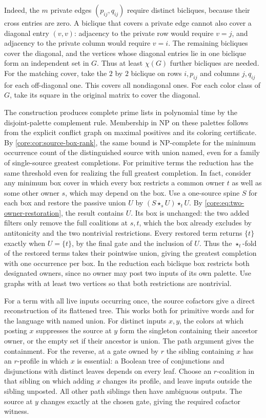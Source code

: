 Indeed, the $m$ private edges $(p_{ij},q_{ij})$
require distinct bicliques, because their cross
entries are zero. A biclique that covers a private
edge cannot also cover a diagonal entry $(v,v)$:
adjacency to the private row would require $v=j$,
and adjacency to the private column would require
$v=i$. The remaining bicliques cover the diagonal,
and the vertices whose diagonal entries lie in one
biclique form an independent set in $G$. Thus at
least $\chi(G)$ further bicliques are needed. For
the matching cover, take the $2$ by $2$ biclique on
rows $i,p_{ij}$ and columns $j,q_{ij}$ for each
off-diagonal one. This covers all nondiagonal ones.
For each color class of $G$, take its square in the
original matrix to cover the diagonal.

The construction produces complete prime lists in
polynomial time by the disjoint-palette complement
rule. Membership in NP on these palettes follows
from the explicit conflict graph on maximal positives
and its coloring certificate. By
\cref{core:cor:source-box-rank}, the same bound is
NP-complete for the minimum occurrence count of the
distinguished source with union named, even for a
family of single-source greatest completions. For
primitive terms the reduction has the same threshold
even for realizing the full greatest completion.
In fact, consider any minimum box cover in which
every box restricts a common owner $t$ as well as
some other owner $s$, which may depend on the box.
Use a one-source spine $S$ for each box and restore
the passive union $U$ by $(S\star_s U)\star_t U$.
By \eqref{core:eq:two-owner-restoration}, the result
contains $U$. Its box is unchanged: the two added
filters only remove the full coalitions at $s,t$,
which the box already excludes by antitonicity and
the two nontrivial restrictions. Every restored
term returns $\{t\}$ exactly when $U=\{t\}$, by
the final gate and the inclusion of $U$. Thus the
$\star_t$-fold of the restored terms takes their
pointwise union, giving the greatest completion
with one occurrence per box. In the reduction each
biclique box restricts both designated owners,
since no owner may post two inputs of its own
palette. Use graphs with at least two vertices so
that both restrictions are nontrivial.

For a term with all live inputs occurring once, the source
cofactors give a direct reconstruction of its flattened tree.
This works both for primitive words and for the language with
named union. For distinct inputs $x,y$, the colors at which
posting $x$ suppresses the source at $y$ form the singleton
containing their ancestor owner, or the empty set if their
ancestor is union. The path argument gives the containment.
For the reverse, at a gate owned by $r$ the sibling containing
$x$ has an $r$-profile in which $x$ is essential: a Boolean
tree of conjunctions and disjunctions with distinct leaves
depends on every leaf. Choose an $r$-coalition in that sibling
on which adding $x$ changes its profile, and leave inputs
outside the sibling unposted. All other path siblings then
have ambiguous outputs. The source at $y$ changes exactly
at the chosen gate, giving the required cofactor witness.

